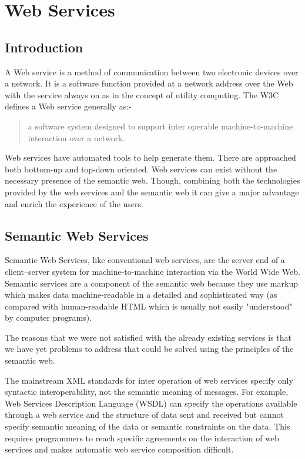 \section*{Web Services}

\subsection*{Introduction}
A Web service is a method of communication between two electronic devices over a network. It is a software function provided at a network address over the Web with the service always on as in the concept of utility computing. The W3C defines a Web service generally as:-
\begin{quote}
\centering
a software system designed to support inter operable machine-to-machine interaction over a network.
\end{quote}

Web services have automated tools to help generate them. There are approached both bottom-up and top-down oriented. Web services can exist without the necessary presence of the semantic web. Though, combining both the technologies provided by the web services and the semantic web it can give a major advantage and enrich the experience of the users.

\subsection*{Semantic Web Services}
Semantic Web Services, like conventional web services, are the server end of a client–server system for machine-to-machine interaction via the World Wide Web. Semantic services are a component of the semantic web because they use markup which makes data machine-readable in a detailed and sophisticated way (as compared with human-readable HTML which is usually not easily "understood" by computer programs).

The reasons that we were not satisfied with the already existing services is that we have yet problems to address that could be solved using the principles of the semantic web.

The mainstream XML standards for inter operation of web services specify only syntactic interoperability, not the semantic meaning of messages. For example, Web Services Description Language (WSDL) can specify the operations available through a web service and the structure of data sent and received but cannot specify semantic meaning of the data or semantic constraints on the data. This requires programmers to reach specific agreements on the interaction of web services and makes automatic web service composition difficult.

